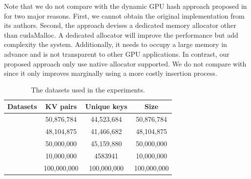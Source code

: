 Note that we do not compare with the dynamic GPU hash approach proposed in \cite{ashkiani2018dynamic} for two major reasons. First, we cannot obtain the original implementation from its authors. Second, the approach devises a dedicated memory allocator other than cudaMalloc. A dedicated allocator will improve the performance but add complexity the system. Additionally, it needs to occupy a large memory in advance and is not transparent to other GPU applications.
In contrast, our proposed approach only use native allocator supported. 
We do not compare with \cite{breslow2016horton} since it only improves \megakv marginally using a more costly insertion process.

\begin{table}[t]
	\caption{The datasets used in the experiments.}
	\label{table:exp_data_sets}
	\centering
	\begin{tabular}{|c|c|c|c|}
		\hline
		Datasets & KV pairs & Unique keys & Size \\ \hline
		\dstwitter &50,876,784 & 44,523,684&50,876,784\\ \hline
		\dsreddit & 48,104,875 & 41,466,682 & 48,104,875\\ \hline
		\dstpch &50,000,000 & 45,159,880&50,000,000 \\ \hline
		\dsali &10,000,000 & 4583941&10,000,000 \\ \hline
		\dsrandom & 100,000,000& 100,000,000&100,000,000 \\ \hline
	\end{tabular}
\end{table}

